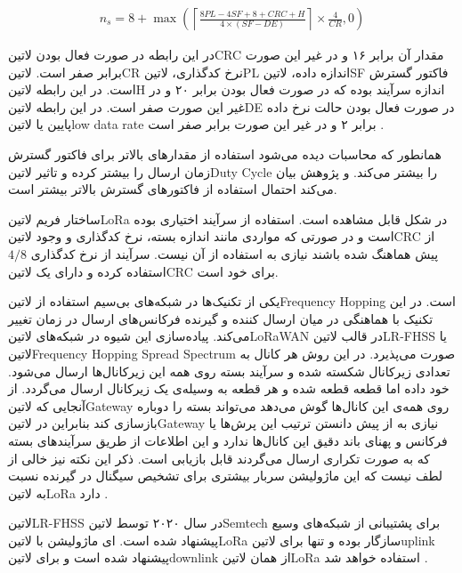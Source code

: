 \begin{align}
  \label{معادله: تعداد علائم مورد نیاز در LoRa}
  n_{s} = 8 + \max\left( \left\lceil \frac{8PL - 4SF + 8 + CRC + H}{4 \times (SF - DE)} \right\rceil \times \frac{4}{CR}, 0 \right)
\end{align}

در این رابطه در صورت فعال بودن ‌لاتین{CRC} مقدار آن برابر ۱۶ و در غیر این صورت برابر صفر است.
‌لاتین{CR} نرخ کدگذاری،
‌لاتین{PL} اندازه داده،
‌لاتین{SF} فاکتور گسترش است.
در این رابطه ‌لاتین{H} اندازه سرآیند بوده که در صورت فعال بودن برابر ۲۰ و در غیر این صورت صفر است.
در این رابطه ‌لاتین{DE} در صورت فعال بودن حالت نرخ داده پایین یا ‌لاتین{low data rate} برابر ۲ و در غیر این صورت برابر صفر است
.

همانطور که محاسبات دیده می‌شود استفاده از مقدارهای بالاتر برای فاکتور گسترش زمان ارسال را بیشتر کرده و تاثیر ‌لاتین{Duty Cycle} را بیشتر می‌کند.
و پژوهش  بیان می‌کند احتمال استفاده از فاکتورهای گسترش بالاتر بیشتر است.

ساختار فریم ‌لاتین{LoRa} در شکل  قابل مشاهده است. استفاده از سرآیند اختیاری بوده است و در صورتی که مواردی مانند اندازه بسته،
نرخ کدگذاری و وجود ‌لاتین{CRC} از پیش هماهنگ شده باشند نیازی به استفاده از آن نیست. سرآیند از نرخ کدگذاری $4/8$ استفاده کرده و دارای یک ‌لاتین{CRC}
برای خود است.


یکی از تکنیک‌ها در شبکه‌های بی‌سیم استفاده از ‌لاتین{Frequency Hopping} است. در این تکنیک با هماهنگی در میان ارسال کننده و گیرنده فرکانس‌های ارسال در زمان
تغییر می‌کند. پیاده‌سازی این شیوه در شبکه‌های ‌لاتین{LoRaWAN} در قالب ‌لاتین{LR-FHSS} یا
‌لاتین{Frequency Hopping Spread Spectrum}
صورت می‌پذیرد. در این روش هر کانال به تعدادی زیرکانال شکسته شده و سرآیند بسته روی همه این زیرکانال‌ها ارسال می‌شود.
خود داده اما قطعه قطعه شده و هر قطعه به وسیله‌ی یک زیرکانال ارسال می‌گردد.
از آنجایی که ‌لاتین{Gateway} روی همه‌ی این کانال‌ها گوش می‌دهد می‌تواند بسته را دوباره بازسازی کند بنابراین
در ‌لاتین{Gateway} نیازی به از پیش دانستن ترتیب این پرش‌ها یا فرکانس و پهنای باند دقیق این کانال‌ها ندارد
و این اطلاعات از طریق سرآیندهای بسته که به صورت تکراری ارسال می‌گردند قابل بازیابی است.
ذکر این نکته نیز خالی از لطف نیست که این ماژولیشن سربار بیشتری برای تشخیص سیگنال در گیرنده نسبت به ‌لاتین{LoRa} دارد
.

‌لاتین{LR-FHSS} در سال ۲۰۲۰ توسط ‌لاتین{Semtech} برای پشتیبانی از شبکه‌های وسیع پیشنهاد شده است.
ای ماژولیشن با ‌لاتین{LoRa} سازگار بوده و تنها برای ‌لاتین{uplink} پیشنهاد شده است و برای ‌لاتین{downlink} از همان
‌لاتین{LoRa} استفاده خواهد شد
.

